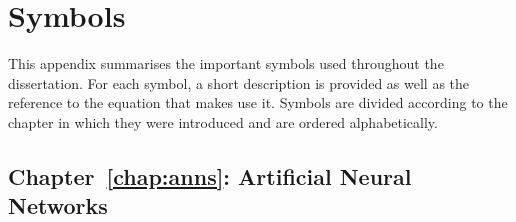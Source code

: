 \chapter{Symbols}
\label{app:symbols}

This appendix summarises the important symbols used throughout the dissertation.
For each symbol, a short description is provided as well as the reference to the
equation that makes use it. Symbols are divided according to the chapter in
which they were introduced and are ordered alphabetically.


\section{Chapter~\ref{chap:anns}: Artificial Neural Networks}
\label{sec:symbols:anns}

  
